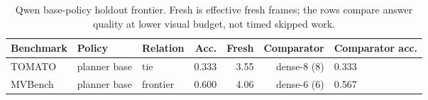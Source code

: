 \begin{table}[H]
\centering
\caption{Qwen base-policy holdout frontier. Fresh is effective fresh frames; the rows compare answer quality at lower visual budget, not timed skipped work.}
\label{tab:lane-a-holdout}
\small
\renewcommand{\arraystretch}{\PaperTableStretch}
\begin{tabular}{lllrrrl}
\toprule
Benchmark & Policy & Relation & Acc. & Fresh & Comparator & Comparator acc. \\
\midrule
TOMATO & planner base & tie & 0.333 & 3.55 & dense-8 (8) & 0.333 \\
MVBench & planner base & frontier & 0.600 & 4.06 & dense-6 (6) & 0.567 \\
\bottomrule
\end{tabular}
\end{table}
